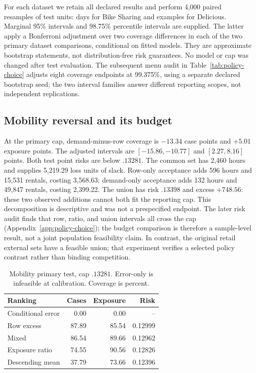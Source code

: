 For each dataset we retain all declared results and perform 4,000 paired resamples of test units: days for Bike Sharing and examples for Delicious. Marginal 95\% intervals and 98.75\% percentile intervals are supplied. The latter apply a Bonferroni adjustment over two coverage differences in each of the two primary dataset comparisons, conditional on fitted models. They are approximate bootstrap statements, not distribution-free risk guarantees. No model or cap was changed after test evaluation. The subsequent menu audit in Table~\ref{tab:policy-choice} adjusts eight coverage endpoints at 99.375\%, using a separate declared bootstrap seed; the two interval families answer different reporting scopes, not independent replications.

\subsection{Mobility reversal and its budget}
At the primary cap, demand-minus-row coverage is $-13.34$ case points and $+5.01$ exposure points. The adjusted intervals are $[-15.86,-10.77]$ and $[2.27,8.16]$ points. Both test point risks are below $.13281$. The common set has 2,460 hours and supplies 5,219.29 loss units of slack. Row-only acceptance adds 596 hours and 15,531 rentals, costing 3,568.63; demand-only acceptance adds 132 hours and 49,847 rentals, costing 2,399.22. The union has risk $.13398$ and excess $+748.56$: these two observed additions cannot both fit the reporting cap. This decomposition is descriptive and was not a prespecified endpoint. The later risk audit finds that row, ratio, and union intervals all cross the cap (Appendix~\ref{app:policy-choice}); the budget comparison is therefore a sample-level result, not a joint population feasibility claim. In contrast, the original retail external sets have a feasible union; that experiment verifies a selected policy contrast rather than binding competition.

\begin{table}[t]\centering\small
\caption{Mobility primary test, cap $.13281$. Error-only is infeasible at calibration. Coverage is percent.}\label{tab:mobility}
\begin{tabular}{lrrr}\toprule
Ranking & Cases & Exposure & Risk\\\midrule
Conditional error & 0.00 & 0.00 & --\\
Row excess & 87.89 & 85.54 & 0.12999\\
Mixed & 86.54 & 89.66 & 0.12962\\
Exposure ratio & 74.55 & 90.56 & 0.12826\\
Descending mean & 37.79 & 73.66 & 0.12396\\
\bottomrule\end{tabular}\end{table}

